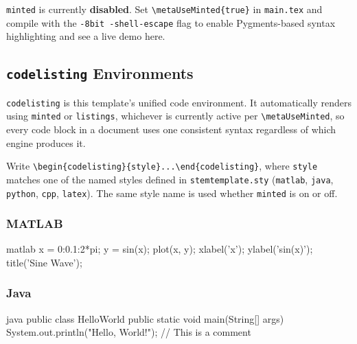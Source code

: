 	\else
	
	\texttt{minted} is currently \textbf{disabled}. Set \texttt{\textbackslash metaUseMinted\{true\}} in \texttt{main.tex} and compile with the \texttt{-8bit -shell-escape} flag to enable Pygments-based syntax highlighting and see a live demo here.
	
	\fi
	
	\subsection{\texttt{codelisting} Environments}
	\noindent\colorbox{themecolour!15}{\parbox{\linewidth}{\small \texttt{codelisting} is this template's unified code environment. It automatically renders using \texttt{minted} or \texttt{listings}, whichever is currently active per \texttt{\textbackslash metaUseMinted}, so every code block in a document uses one consistent syntax regardless of which engine produces it.}}\vspace{0.5\baselineskip}
	
	Write \texttt{\textbackslash begin\{codelisting\}\{style\}...\textbackslash end\{codelisting\}}, where \texttt{style} matches one of the named styles defined in \texttt{stemtemplate.sty} (\texttt{matlab}, \texttt{java}, \texttt{python}, \texttt{cpp}, \texttt{latex}). The same style name is used whether \texttt{minted} is on or off.
	
		\subsubsection{MATLAB}
{\vspace{10pt}
	\label{lst:MATLAB}
	\vspace{-4pt}}
\begin{codelisting}{matlab}
	x = 0:0.1:2*pi; %
	y = sin(x);
	plot(x, y);
	xlabel('x'); ylabel('sin(x)');
	title('Sine Wave');
\end{codelisting}
		
		\subsubsection{Java}
{\vspace{10pt}
	\label{lst:java}
	\vspace{-4pt}}
\begin{codelisting}{java}
	public class HelloWorld {
		public static void main(String[] args) {
			System.out.println("Hello, World!");
		} // This is a comment
	}
\end{codelisting}
		
